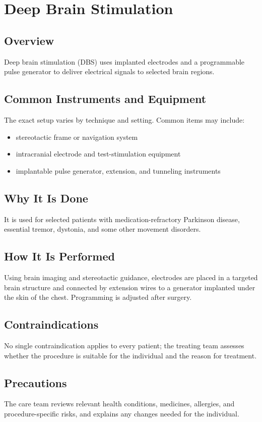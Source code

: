 \chapter{Deep Brain Stimulation}

\section*{Overview}
Deep brain stimulation (DBS) uses implanted electrodes and a programmable pulse generator to deliver electrical signals to selected brain regions.

\section*{Common Instruments and Equipment}
The exact setup varies by technique and setting. Common items may include:
\begin{itemize}[nosep,leftmargin=*]
  \item stereotactic frame or navigation system
  \item intracranial electrode and test-stimulation equipment
  \item implantable pulse generator, extension, and tunneling instruments
\end{itemize}

\section*{Why It Is Done}
It is used for selected patients with medication-refractory Parkinson disease, essential tremor, dystonia, and some other movement disorders.

\section*{How It Is Performed}
Using brain imaging and stereotactic guidance, electrodes are placed in a targeted brain structure and connected by extension wires to a generator implanted under the skin of the chest. Programming is adjusted after surgery.

\section*{Contraindications}
No single contraindication applies to every patient; the treating team assesses whether the procedure is suitable for the individual and the reason for treatment.

\section*{Precautions}
The care team reviews relevant health conditions, medicines, allergies, and procedure-specific risks, and explains any changes needed for the individual.


